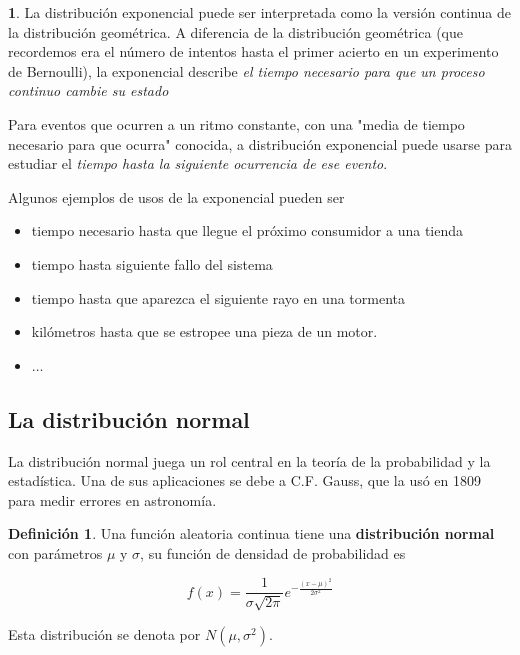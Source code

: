 \documentclass[]{book}
\theoremstyle{plain}
\theoremstyle{definition}
\newtheorem{definition}[theorem]{Definición}
\theoremstyle{definition} %
\newcommand{\thistheoremname}{}
\newtheorem{genericthm}[theorem]{\thistheoremname}
\newenvironment{customdef}[1]
  {\renewcommand{\thistheoremname}{#1}%
   \begin{genericthm}}
  {\end{genericthm}}
\begin{document}
\begin{customdef}{Aplicaciones de la distribución exponencial}
  La distribución exponencial puede ser interpretada como la versión continua de la distribución geométrica. A diferencia de la 
  distribución geométrica (que recordemos era el número de intentos hasta el primer acierto en un experimento de Bernoulli), 
  la exponencial describe \emph{el tiempo necesario para que un proceso continuo cambie su estado}

  Para eventos que ocurren a un ritmo constante, con una "media de tiempo necesario para que ocurra" conocida, a distribución exponencial 
  puede usarse para estudiar el \emph{tiempo hasta la siguiente ocurrencia de ese evento}. 

  Algunos ejemplos de usos de la exponencial pueden ser 
  \begin{itemize}
    \item tiempo necesario hasta que llegue el próximo consumidor a una tienda
    \item tiempo hasta siguiente fallo del sistema
    \item tiempo hasta que aparezca el siguiente rayo en una tormenta
    \item kilómetros hasta que se estropee una pieza de un motor.
    \item $\ldots$
  \end{itemize}
\end{customdef}


\subsection{La distribución normal} 

La distribución normal juega un rol central en la teoría de la
probabilidad y la estadística. Una de sus aplicaciones se debe a C.F.
Gauss, que la usó en 1809 para medir errores en astronomía.

\begin{definition}
  
Una función aleatoria continua tiene una \textbf{distribución normal}
con parámetros \(\mu\) y \(\sigma\), su función de densidad de
probabilidad es

\[f(x) = \frac{1}{\sigma \sqrt{2\pi}} e^{-\frac{(x-\mu)^2}{2\sigma^2}}\]

Esta distribución se denota por \(N(\mu, \sigma^2)\).
\end{definition}
\end{document}

